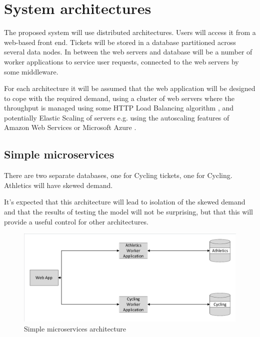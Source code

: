 %
%

\section{System architectures}

The proposed system will use distributed architectures.  Users will access it from a web-based front end.  Tickets will be stored in a database partitioned across several data nodes.  In between the web servers and database will be a number of worker applications to service user requests, connected to the web servers by some middleware.

For each architecture it will be assumed that the web application will be designed to cope with the required demand, using a cluster of web servers where the throughput is managed using some HTTP Load Balancing algorithm \cite{RN73}, and potentially Elastic Scaling of servers e.g. using the autoscaling features of Amazon Web Services \cite{RN1064} or Microsoft Azure \cite{RN1065}.

%
%
\subsection{Simple microservices}

There are two separate databases, one for Cycling tickets, one for Cycling.  Athletics will have skewed demand.

It's expected that this architecture will lead to isolation of the skewed demand and that the results of testing the model will not be surprising, but that this will provide a useful control for other architectures.

\begin{figure}
	\caption{Simple microservices architecture}
	\centering
	\includegraphics[trim = 5 5 5 5, clip, width=\textwidth]{img/simplemicro}
\end{figure}

